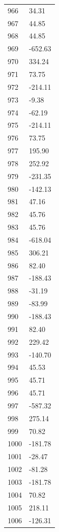 \documentclass[a4paper,11pt]{article}
\begin{document}
\begin{center}
\begin{longtable}{|R{1.5cm}|R{2.5cm}|}
  966 &        34.31 \\
  967 &        44.85 \\
  968 &        44.85 \\
  969 &      -652.63 \\
  970 &       334.24 \\
  971 &        73.75 \\
  972 &      -214.11 \\
  973 &        -9.38 \\
  974 &       -62.19 \\
  975 &      -214.11 \\
  976 &        73.75 \\
  977 &       195.90 \\
  978 &       252.92 \\
  979 &      -231.35 \\
  980 &      -142.13 \\
  981 &        47.16 \\
  982 &        45.76 \\
  983 &        45.76 \\
  984 &      -618.04 \\
  985 &       306.21 \\
  986 &        82.40 \\
  987 &      -188.43 \\
  988 &       -31.19 \\
  989 &       -83.99 \\
  990 &      -188.43 \\
  991 &        82.40 \\
  992 &       229.42 \\
  993 &      -140.70 \\
  994 &        45.53 \\
  995 &        45.71 \\
  996 &        45.71 \\
  997 &      -587.32 \\
  998 &       275.14 \\
  999 &        70.82 \\
 1000 &      -181.78 \\
 1001 &       -28.47 \\
 1002 &       -81.28 \\
 1003 &      -181.78 \\
 1004 &        70.82 \\
 1005 &       218.11 \\
 1006 &      -126.31 \\

\end{longtable}
\end{center}
\end{document}
